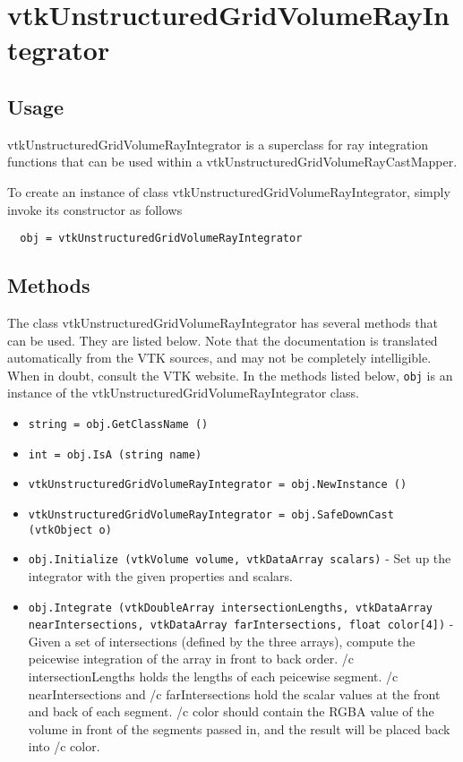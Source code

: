 \section{vtkUnstructuredGridVolumeRayIntegrator}

\subsection{Usage}


 vtkUnstructuredGridVolumeRayIntegrator is a superclass for ray
 integration functions that can be used within a
 vtkUnstructuredGridVolumeRayCastMapper.


To create an instance of class vtkUnstructuredGridVolumeRayIntegrator, simply
invoke its constructor as follows
\begin{verbatim}
  obj = vtkUnstructuredGridVolumeRayIntegrator
\end{verbatim}
\subsection{Methods}

The class vtkUnstructuredGridVolumeRayIntegrator has several methods that can be used.
  They are listed below.
Note that the documentation is translated automatically from the VTK sources,
and may not be completely intelligible.  When in doubt, consult the VTK website.
In the methods listed below, \verb|obj| is an instance of the vtkUnstructuredGridVolumeRayIntegrator class.
\begin{itemize}
\item  \verb|string = obj.GetClassName ()|

\item  \verb|int = obj.IsA (string name)|

\item  \verb|vtkUnstructuredGridVolumeRayIntegrator = obj.NewInstance ()|

\item  \verb|vtkUnstructuredGridVolumeRayIntegrator = obj.SafeDownCast (vtkObject o)|

\item  \verb|obj.Initialize (vtkVolume volume, vtkDataArray scalars)| -  Set up the integrator with the given properties and scalars.

\item  \verb|obj.Integrate (vtkDoubleArray intersectionLengths, vtkDataArray nearIntersections, vtkDataArray farIntersections, float color[4])| -  Given a set of intersections (defined by the three arrays), compute
 the peicewise integration of the array in front to back order.
 /c intersectionLengths holds the lengths of each peicewise segment.
 /c nearIntersections and /c farIntersections hold the scalar values at
 the front and back of each segment.  /c color should contain the RGBA
 value of the volume in front of the segments passed in, and the result
 will be placed back into /c color.

\end{itemize}
